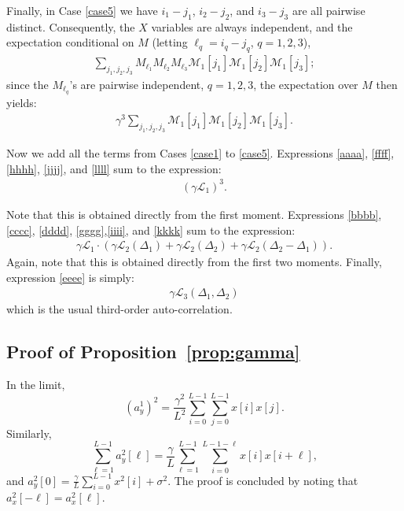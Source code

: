 \documentclass[12pt]{article}
\newcommand{\1}{\mathbf{1}}
\newcommand{\M}{\mathcal{M}}
\renewcommand{\L}{\mathcal{L}}
\theoremstyle{plain}
\theoremstyle{definition}
\theoremstyle{remark}
\theoremstyle{plain}
\theoremstyle{remark}
\theoremstyle{plain}
\theoremstyle{plain}
\theoremstyle{plain}
\numberwithin{equation}{section}
\begin{document}
Finally, in Case \ref{case5} we have $i_1 - j_1$, $i_2 - j_2$, and $i_3 - j_3$ are all pairwise distinct. Consequently, the $X$ variables are always independent, and the expectation conditional on $M$ (letting $\ell_q = i_q - j_q$, $q=1,2,3$),
%
\begin{align}
%
\sum_{j_1,j_2,j_3} M_{\ell_1} M_{\ell_2} M_{\ell_3} \M_1[j_1] \M_1[j_2] \M_1[j_3];
%
\end{align}
%
since the $M_{\ell_q}$'s are pairwise independent, $q=1,2,3$, the expectation over $M$ then yields:
%
\begin{align} \label{llll}
%
\gamma^3 \sum_{j_1,j_2,j_3} \M_1[j_1] \M_1[j_2] \M_1[j_3].
%
\end{align}

Now we add all the terms from Cases \ref{case1} to \ref{case5}. Expressions \eqref{aaaa}, \eqref{ffff}, \eqref{hhhh}, \eqref{jjjj}, and \eqref{llll} sum to the expression:
%
\begin{align}
%
(\gamma \L_1)^3.
%
\end{align}

Note that this is obtained directly from the first moment. Expressions \eqref{bbbb}, \eqref{cccc}, \eqref{dddd}, \eqref{gggg},\eqref{iiii}, and \eqref{kkkk} sum to the expression:
%
\begin{align}
%
\gamma \L_1  \cdot 
( \gamma\L_2(\Delta_1) + \gamma\L_2(\Delta_2) + \gamma\L_2(\Delta_2-\Delta_1)).
%
\end{align}
%
Again, note that this is obtained directly from the first two moments. Finally, expression \eqref{eeee} is simply:
%
\begin{align}
%
\gamma \L_3(\Delta_1,\Delta_2)
%
\end{align}
%
which is the usual third-order auto-correlation.


\subsection{Proof of Proposition~\ref{prop:gamma}} \label{sec:proof_prop_gamma}

In the limit, 
\begin{equation*}
(a^1_y)^2=\frac{\gamma^2}{L^2}\sum_{i=0}^{L-1}\sum_{j=0}^{L-1}x[i]x[j].
\end{equation*}
Similarly,  
\begin{equation*}
\sum_{\ell = 1}^{L-1}a_y^2[\ell]=\frac{\gamma}{L}\sum_{\ell = 1}^{L-1}\sum_{i=0}^{L-1-\ell}x[i]x[i+\ell],
\end{equation*}
and $a_y^2[0]=\frac{\gamma}{L}\sum_{i=0}^{L-1}x^2[i] + \sigma^2$. The proof is concluded by noting that  $a_x^2[-\ell]=a_x^2[\ell]$. 
\end{document}
